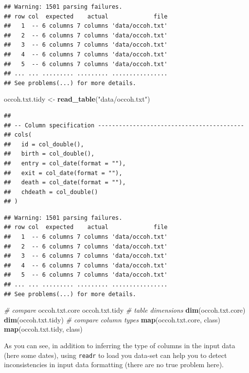 \documentclass[
]{book}
\newenvironment{Shaded}{\begin{snugshade}}{\end{snugshade}}
\newcommand{\CommentTok}[1]{\textcolor[rgb]{0.56,0.35,0.01}{\textit{#1}}}
\newcommand{\FunctionTok}[1]{\textcolor[rgb]{0.13,0.29,0.53}{\textbf{#1}}}
\newcommand{\NormalTok}[1]{#1}
\newcommand{\OtherTok}[1]{\textcolor[rgb]{0.56,0.35,0.01}{#1}}
\newcommand{\StringTok}[1]{\textcolor[rgb]{0.31,0.60,0.02}{#1}}
\begin{document}
\begin{verbatim}
## Warning: 1501 parsing failures.
## row col  expected    actual             file
##   1  -- 6 columns 7 columns 'data/occoh.txt'
##   2  -- 6 columns 7 columns 'data/occoh.txt'
##   3  -- 6 columns 7 columns 'data/occoh.txt'
##   4  -- 6 columns 7 columns 'data/occoh.txt'
##   5  -- 6 columns 7 columns 'data/occoh.txt'
## ... ... ......... ......... ................
## See problems(...) for more details.
\end{verbatim}

\begin{Shaded}
\begin{Highlighting}[]
\NormalTok{occoh.txt.tidy }\OtherTok{\textless{}{-}} \FunctionTok{read\_table}\NormalTok{(}\StringTok{"data/occoh.txt"}\NormalTok{)}
\end{Highlighting}
\end{Shaded}

\begin{verbatim}
## 
## -- Column specification ------------------------------------------
## cols(
##   id = col_double(),
##   birth = col_double(),
##   entry = col_date(format = ""),
##   exit = col_date(format = ""),
##   death = col_date(format = ""),
##   chdeath = col_double()
## )
\end{verbatim}

\begin{verbatim}
## Warning: 1501 parsing failures.
## row col  expected    actual             file
##   1  -- 6 columns 7 columns 'data/occoh.txt'
##   2  -- 6 columns 7 columns 'data/occoh.txt'
##   3  -- 6 columns 7 columns 'data/occoh.txt'
##   4  -- 6 columns 7 columns 'data/occoh.txt'
##   5  -- 6 columns 7 columns 'data/occoh.txt'
## ... ... ......... ......... ................
## See problems(...) for more details.
\end{verbatim}

\begin{Shaded}
\begin{Highlighting}[]
\CommentTok{\# compare}
\NormalTok{occoh.txt.core}
\NormalTok{occoh.txt.tidy}
\CommentTok{\# table dimensions}
\FunctionTok{dim}\NormalTok{(occoh.txt.core)}
\FunctionTok{dim}\NormalTok{(occoh.txt.tidy)}
\CommentTok{\# compare column types}
\FunctionTok{map}\NormalTok{(occoh.txt.core, class)}
\FunctionTok{map}\NormalTok{(occoh.txt.tidy, class)}
\end{Highlighting}
\end{Shaded}

As you can see, in addition to inferring the type of columns in the input data (here some dates), using \texttt{readr} to load you data-set can help you to detect inconsistencies in input data formatting (there are no true problem here).
\end{document}
